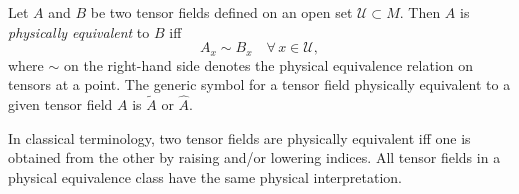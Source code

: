 Let $A$ and $B$ be two tensor fields defined on an open set $\mathcal{U} \subset M$. Then $A$ is \textit{physically equivalent} to $B$ iff
$$A_x \sim B_x \quad \forall\, x \in \mathcal{U},$$
where $\sim$ on the right-hand side denotes the physical equivalence relation on tensors at a point. The generic symbol for a tensor field physically equivalent to a given tensor field $A$ is $\tilde{A}$ or $\hat{A}$.

In classical terminology, two tensor fields are physically equivalent iff one is obtained from the other by raising and/or lowering indices. All tensor fields in a physical equivalence class have the same physical interpretation.

